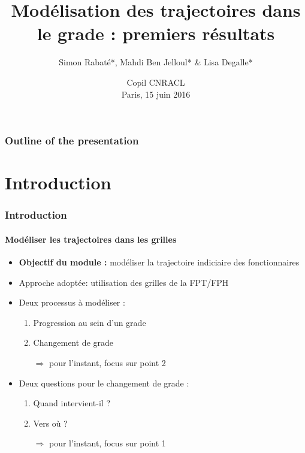 \documentclass[xcolor=table,ignorenonframetext,12pt]{beamer}
\title{Modélisation des trajectoires dans le grade : premiers résultats}
\author{Simon Rabaté*, Mahdi Ben Jelloul* \& Lisa Degalle*}
\institute{
  \inst{*} IPP
}
\date{Copil CNRACL\\
	Paris, 15 juin 2016}
\newenvironment{choixmarges}[2]{\begin{list}{}{%
\setlength{\topsep}{0pt}%
\setlength{\leftmargin}{0pt}%
\setlength{\rightmargin}{0pt}%
\setlength{\listparindent}{\parindent}%
\setlength{\itemindent}{\parindent}%
\setlength{\parsep}{0pt plus 1pt}%
\addtolength{\leftmargin}{#1}%
\addtolength{\rightmargin}{#2}%
}\item }{\end{list}}
\begin{document}
\frame{\maketitle}


\begin{frame}
    \frametitle{Outline of the presentation}
    \tableofcontents[hidesubsections]
\end{frame}



\section{Introduction}


\begin{frame}
\frametitle{Introduction}
\framesubtitle{Modéliser les trajectoires dans les grilles}


\begin{choixmarges}{-0.5cm}{-0.5cm}



\begin{itemize}
\item \textbf{Objectif du module :} modéliser la trajectoire indiciaire des fonctionnaires
\vspace{0.1cm}

\item Approche adoptée: utilisation des grilles de la FPT/FPH

\vspace{0.1cm}
\item Deux processus à modéliser : 
	\begin{enumerate}
	\item Progression au sein d'un grade \\
	\item Changement de grade
	\item[$\Rightarrow$] pour l'instant, focus sur point 2
	\end{enumerate}

\vspace{0.1cm}
\item Deux questions pour le changement de grade : 
	\begin{enumerate}
	\item Quand intervient-il ? 
	\item Vers où ? 
	\item[$\Rightarrow$]  pour l'instant, focus sur point 1
	\end{enumerate}

	
\end{itemize}


\end{choixmarges}
\end{frame}
\end{document}
